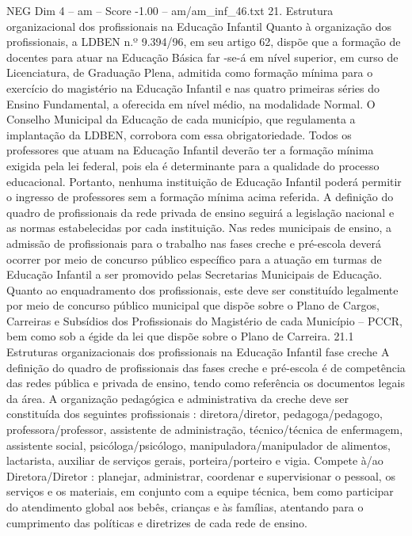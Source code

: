 \begin{textsample}{NEG Dim 4 – am – Score -1.00 – am/am\_inf\_46.txt}  \label{ex:f4_neg_190}
21.
Estrutura organizacional dos profissionais na Educação Infantil Quanto à organização dos profissionais, a LDBEN n.º 9.394/96, em seu artigo 62, dispõe que a formação de docentes para atuar na Educação Básica far -se-á em nível superior, em curso de Licenciatura, de Graduação Plena, admitida como formação mínima para o exercício do magistério na Educação Infantil e nas quatro primeiras séries do Ensino Fundamental, a oferecida em nível médio, na modalidade Normal.
O Conselho Municipal da Educação de cada município, que regulamenta a implantação da LDBEN, corrobora com essa obrigatoriedade.
Todos os professores que atuam na Educação Infantil deverão ter a formação mínima exigida pela lei federal, pois ela é determinante para a qualidade do processo educacional.
Portanto, nenhuma instituição de Educação Infantil poderá permitir o ingresso de professores sem a formação mínima acima referida.
A definição do quadro de profissionais da rede privada de ensino seguirá a legislação nacional e as normas estabelecidas por cada instituição.
Nas redes municipais de ensino, a admissão de profissionais para o trabalho nas fases creche e pré-escola deverá ocorrer por meio de concurso público específico para a atuação em turmas de Educação Infantil a ser promovido pelas Secretarias Municipais de Educação.
Quanto ao enquadramento dos profissionais, este deve ser constituído legalmente por meio de concurso público municipal que dispõe sobre o Plano de Cargos, Carreiras e Subsídios dos Profissionais do Magistério de cada Município – PCCR, bem como sob a égide da lei que dispõe sobre o Plano de Carreira. 21.1 Estruturas organizacionais dos profissionais na Educação Infantil fase creche A definição do quadro de profissionais das fases creche e pré-escola é de competência das redes pública e privada de ensino, tendo como referência os documentos legais da área.
A organização pedagógica e administrativa da creche deve ser constituída dos seguintes profissionais : diretora/diretor, pedagoga/pedagogo, professora/professor, assistente de administração, técnico/técnica de enfermagem, assistente social, psicóloga/psicólogo, manipuladora/manipulador de alimentos, lactarista, auxiliar de serviços gerais, porteira/porteiro e vigia.
Compete à/ao Diretora/Diretor : planejar, administrar, coordenar e supervisionar o pessoal, os serviços e os materiais, em conjunto com a equipe técnica, bem como participar do atendimento global aos bebês, crianças e às famílias, atentando para o cumprimento das políticas e diretrizes de cada rede de ensino.

\end{textsample}
